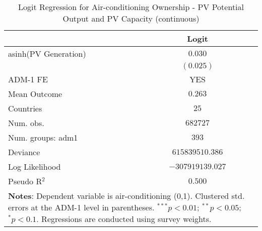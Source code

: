 
\begin{table}[H]
\caption{Logit Regression for Air-conditioning Ownership - PV Potential Output and PV Capacity (continuous)}
\begin{center}
\begin{tabular}{l c}
\hline
 & Logit \\
\hline
asinh(PV Generation) & $0.030$          \\
                     & $(0.025)$        \\
\hline
ADM-1 FE             & YES              \\
Mean Outcome         & $0.263$          \\
Countries            & $25$             \\
Num. obs.            & $682727$         \\
Num. groups: adm1    & $393$            \\
Deviance             & $615839510.386$  \\
Log Likelihood       & $-307919139.027$ \\
Pseudo R$^2$         & $0.500$          \\
\hline
\multicolumn{2}{l}{\scriptsize{\textbf{Notes}: Dependent variable is air-conditioning (0,1). Clustered std. errors at the ADM-1 level in parentheses. $^{***}p<0.01$; $^{**}p<0.05$; $^{*}p<0.1$. Regressions are conducted using survey weights.}}
\end{tabular}
\label{main: tableA9}
\end{center}
\end{table}
